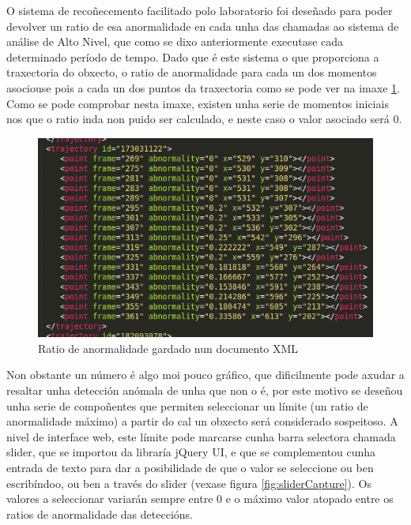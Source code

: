     O sistema de recoñecemento facilitado polo laboratorio foi deseñado para poder devolver un ratio
    de esa anormalidade en cada unha das chamadas ao sistema de análise de Alto Nivel, que como se 
    dixo anteriormente executase cada determinado período de tempo. Dado que é este sistema o que
    proporciona a traxectoria do obxecto, o ratio de anormalidade para cada un dos momentos 
    asociouse pois a cada un dos puntos da traxectoria como se pode ver na imaxe \ref{fig:abXmlRate}.
    Como se pode comprobar nesta imaxe, existen unha serie de momentos iniciais nos que o ratio inda
    non puido ser calculado, e neste caso o valor asociado será 0.
    
    \begin{figure}[htp]
    \begin{center}
        \includegraphics[scale=0.55]{figures/abXmlRate.png}
        \caption{Ratio de anormalidade gardado nun documento XML}
    \label{fig:abXmlRate}
    \end{center}
    \end{figure}
    
    Non obstante un número é algo moi pouco gráfico, que dificilmente pode axudar a resaltar unha 
    detección anómala de unha que non o é, por este motivo se deseñou unha serie de compoñentes que
    permiten seleccionar un límite (un ratio de anormalidade máximo) a partir do cal un obxecto será
    considerado sospeitoso. A nivel de interface web, este límite pode marcarse cunha barra 
    selectora chamada slider, que  se importou da libraría jQuery UI\cite{ComponenteSliderJqueryUi},
    e que se complementou cunha entrada de texto para dar a posibilidade de que o valor se seleccione
    ou ben escribíndoo, ou ben a través do slider (vexase figura \ref{fig:sliderCapture}).
    Os valores a seleccionar variarán sempre entre 0 e o máximo valor atopado entre os ratios de
    anormalidade das deteccións.

